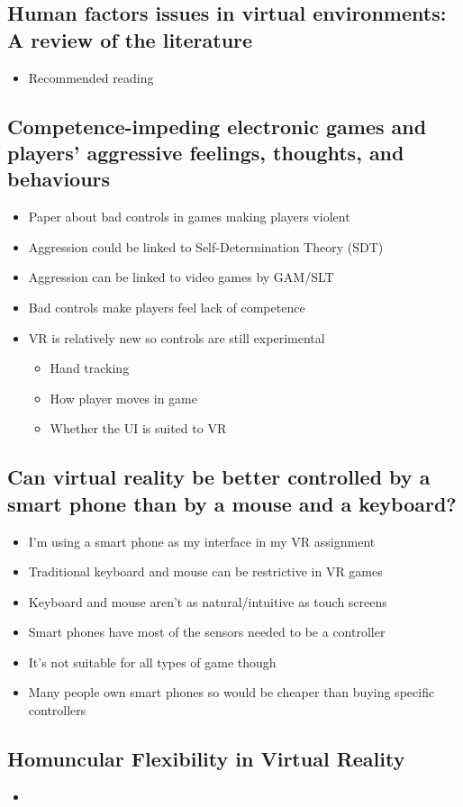 \documentclass{scrartcl}
\begin{document}
\subsection{Human factors issues in virtual environments: A review of the literature \cite{stanney}}

\begin{itemize}
	\item Recommended reading 	
\end{itemize}

\subsection{Competence-impeding electronic games and players’ aggressive feelings, thoughts, and behaviours \cite{przybylski}}

\begin{itemize}
	\item Paper about bad controls in games making players violent 
	\item Aggression could be linked to Self-Determination Theory (SDT) 
	\item Aggression can be linked to video games by GAM/SLT
	\item Bad controls make players feel lack of competence
	\item VR is relatively new so controls are still experimental
	\begin{itemize}
		\item Hand tracking
		\item How player moves in game
		\item Whether the UI is suited to VR
	\end{itemize}	
\end{itemize}

\subsection{Can virtual reality be better controlled by a smart phone than by a mouse and a keyboard? \cite{Kovarova}}

\begin{itemize}
	\item I'm using a smart phone as my interface in my VR assignment	
	\item Traditional keyboard and mouse can be restrictive in VR games
	\item Keyboard and mouse aren't as natural/intuitive as touch screens
	\item Smart phones have most of the sensors needed to be a controller 
	\item It's not suitable for all types of game though
	\item Many people own smart phones so would be cheaper than buying specific controllers
\end{itemize}

\subsection{Homuncular Flexibility in Virtual Reality \cite{won2015homuncular}}
\begin{itemize}
	\item 
\end{itemize}

	


	
\end{document}
